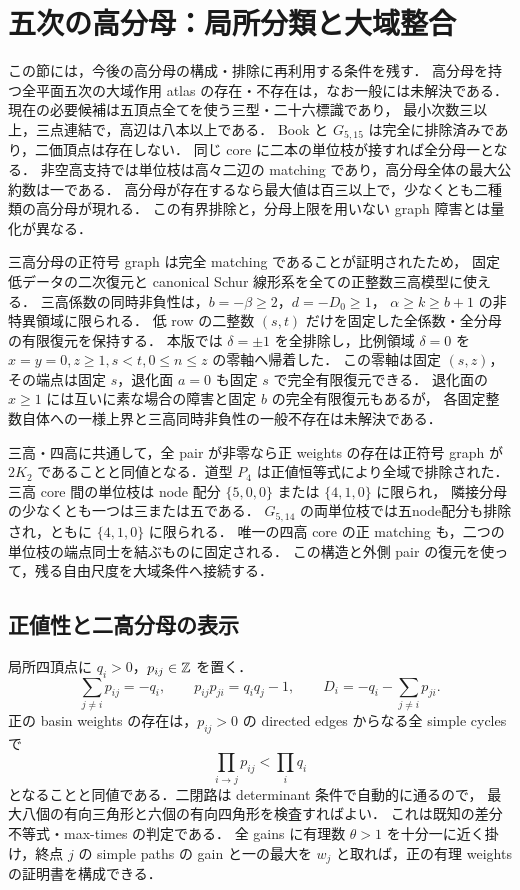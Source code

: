 \section{五次の高分母：局所分類と大域整合}
\label{nt19:denominators}

この節には，今後の高分母の構成・排除に再利用する条件を残す．
高分母を持つ全平面五次の大域作用 atlas の存在・不存在は，なお一般には未解決である．
現在の必要候補は五頂点全てを使う三型・二十六標識であり，
最小次数三以上，三点連結で，高辺は八本以上である．
Book と $G_{5,15}$ は完全に排除済みであり，二価頂点は存在しない．
同じ core に二本の単位枝が接すれば全分母一となる．
非空高支持では単位枝は高々二辺の matching であり，高分母全体の最大公約数は一である．
高分母が存在するなら最大値は百三以上で，少なくとも二種類の高分母が現れる．
この有界排除と，分母上限を用いない graph 障害とは量化が異なる．

三高分母の正符号 graph は完全 matching であることが証明されたため，
固定低データの二次復元と canonical Schur 線形系を全ての正整数三高模型に使える．
三高係数の同時非負性は，$b=-\beta\ge2$，$d=-D_0\ge1$，
$\alpha\ge k\ge b+1$ の非特異領域に限られる．
低 row の二整数 $(s,t)$ だけを固定した全係数・全分母の有限復元を保持する．
本版では $\delta=\pm1$ を全排除し，比例領域 $\delta=0$ を
$x=y=0,z\ge1,s<t,0\le n\le z$ の零軸へ帰着した．
この零軸は固定 $(s,z)$，その端点は固定 $s$，退化面 $a=0$ も固定 $s$ で完全有限復元できる．
退化面の $x\ge1$ には互いに素な場合の障害と固定 $b$ の完全有限復元もあるが，
各固定整数自体への一様上界と三高同時非負性の一般不存在は未解決である．

三高・四高に共通して，全 pair が非零なら正 weights の存在は正符号 graph が
$2K_2$ であることと同値となる．道型 $P_4$ は正値恒等式により全域で排除された．
三高 core 間の単位枝は node 配分 $\{5,0,0\}$ または $\{4,1,0\}$ に限られ，
隣接分母の少なくとも一つは三または五である．
$G_{5,14}$ の両単位枝では五node配分も排除され，ともに $\{4,1,0\}$ に限られる．
唯一の四高 core の正 matching も，二つの単位枝の端点同士を結ぶものに固定される．
この構造と外側 pair の復元を使って，残る自由尺度を大域条件へ接続する．

\subsection{正値性と二高分母の表示}

局所四頂点に $q_i>0$，$p_{ij}\in\mathbb Z$ を置く．
\[
 \sum_{j\ne i}p_{ij}=-q_i,\qquad
 p_{ij}p_{ji}=q_iq_j-1,\qquad
 D_i=-q_i-\sum_{j\ne i}p_{ji}.
\]
正の basin weights の存在は，$p_{ij}>0$ の directed edges からなる全 simple cycles で
\[
 \prod_{i\to j}p_{ij}<\prod_iq_i
\]
となることと同値である．二閉路は determinant 条件で自動的に通るので，
最大八個の有向三角形と六個の有向四角形を検査すればよい．
これは既知の差分不等式・max-times の判定\cite[\S2]{SergeevSchneiderButkovic}である．
全 gains に有理数 $\theta>1$ を十分一に近く掛け，終点 $j$ の simple paths の gain と一の最大を
$w_j$ と取れば，正の有理 weights の証明書を構成できる．

